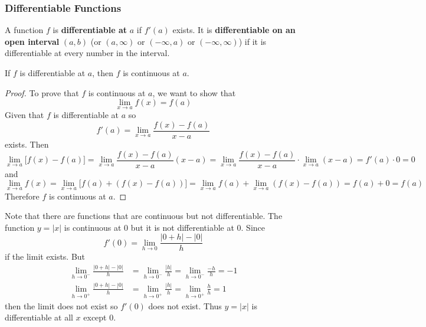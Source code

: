 \subsubsection*{Differentiable Functions}
\begin{definition}
    A function \(f\) is \textbf{differentiable at} \(a\) if \(f'(a)\) exists.
    It is \textbf{differentiable on an open interval} \((a,b)\)
    (or \((a,\infty)\) or \((-\infty,a)\) or \((-\infty,\infty)\))
    if it is differentiable at every number in the interval.
\end{definition}
\begin{theorem}
    If \(f\) is differentiable at \(a\), then \(f\) is continuous at \(a\).
\end{theorem}
\begin{proof}
    To prove that \(f\) is continuous at \(a\),
    we want to show that
    \[\lim_{x\to a}f(x)=f(a)\]
    Given that \(f\) is differentiable at \(a\) so
    \[f'(a)=\lim_{x\to a}\frac{f(x)-f(a)}{x-a}\]
    exists.
    Then
    \[\lim_{x\to a}\big[f(x)-f(a)\big]
    =\lim_{x\to a}\frac{f(x)-f(a)}{x-a}(x-a)
    =\lim_{x\to a}\frac{f(x)-f(a)}{x-a}\cdot\lim_{x\to a}(x-a)
    =f'(a)\cdot 0=0\]
    and
    \[\lim_{x\to a}f(x)=\lim_{x\to a}\big[f(a)+(f(x)-f(a))\big]
    =\lim_{x\to a}f(a)+\lim_{x\to a}(f(x)-f(a))=f(a)+0=f(a)\]
    Therefore \(f\) is continuous at \(a\).
\end{proof}
Note that there are functions that are continuous but not differentiable.
The function \(y=|x|\) is continuous at 0 but it is not differentiable at 0.
Since
\[f'(0)=\lim_{h\to 0}\frac{|0+h|-|0|}{h}\] if the limit exists.
But
\begin{align*}
    \lim_{h\to 0^-}\frac{|0+h|-|0|}{h} &= \lim_{h\to 0^-}\frac{|h|}{h}
    =\lim_{h\to 0^-}\frac{-h}{h}=-1 \\
    \lim_{h\to 0^+}\frac{|0+h|-|0|}{h} &= \lim_{h\to 0^+}\frac{|h|}{h}
    =\lim_{h\to 0^+}\frac{h}{h}=1
\end{align*}
then the limit does not exist so \(f'(0)\) does not exist.
Thus \(y=|x|\) is differentiable at all \(x\) except 0.

